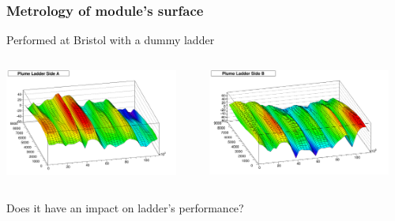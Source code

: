 \documentclass{beamer}
\begin{document}
  \begin{frame}
    \frametitle{Metrology of module's surface}

    \begin{center}
      Performed at Bristol with a dummy ladder
    \end{center}

    \begin{columns}[c]
      \begin{column}{6cm}
        \begin{center}
          \includegraphics[width = 5.7cm]{Pictures/SideAPlumeLadder2010_M20.png}
        \end{center}
      \end{column}

      \begin{column}{6cm}
        \begin{center}
          \includegraphics[width = 6cm]{Pictures/SideBPlumeLadder2010_M20.png}
        \end{center}
      \end{column}
    \end{columns}

    \begin{center}
      Does it have an impact on ladder's performance?
    \end{center}
  \end{frame}

\end{document}
